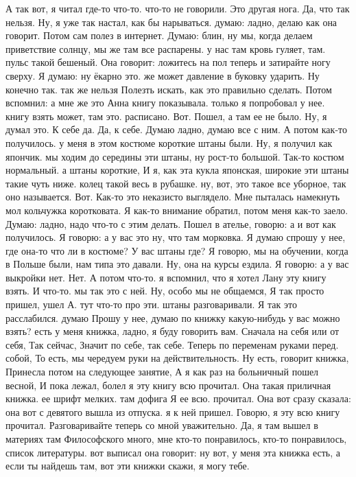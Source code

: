 А так вот, я читал где-то что-то.
что-то не говорили. Это другая нога.
Да, что так нельзя. Ну, я уже так настал, как бы нарываться. думаю: ладно, делаю как она говорит. Потом сам полез в интернет. Думаю: блин, ну мы, когда делаем приветствие солнцу, мы же там все распарены.
у нас там кровь гуляет, там.
пульс такой бешеный. Она говорит: ложитесь на пол теперь и затирайте ногу сверху.
Я думаю: ну ёкарно это.
же может давление в буковку ударить. Ну конечно так. так же нельзя Полезть искать, как это правильно сделать. Потом вспомнил:
а мне же это Анна книгу показывала.
только я попробовал у нее.
книгу взять может, там это.
расписано.
Вот.
Пошел, а там ее не было.
Ну, я думал это.
К себе да.
Да, к себе.
Думаю ладно, думаю все с ним.
А потом как-то получилось. у меня в этом костюме короткие штаны были.
Ну, я получил как япончик. мы ходим до середины эти штаны, ну рост-то большой.
Так-то костюм нормальный.
а штаны короткие, И я, как эта кукла японская, широкие эти штаны такие чуть ниже.
колец такой весь в рубашке. ну, вот, это такое все уборное, так оно называется.
Вот.
Как-то это неказисто выглядело.
Мне пыталась намекнуть мол кольчужка коротковата.
Я как-то внимание обратил, потом меня как-то заело.
Думаю: ладно, надо что-то с этим делать.
Пошел в ателье, говорю: а и вот как получилось.
Я говорю: а у вас это ну, что там морковка.
Я думаю спрошу у нее, где она-то что ли в костюме?
У вас штаны где?
Я говорю, мы на обучении, когда в Польше были, нам типа это давали.
Ну, она на курсы ездила.
Я говорю: а у вас выкройки нет.
Нет.
А потом что-то. я вспомнил, что я хотел Лану эту книгу взять.
И что-то.
мы так это с ней.
Ну, особо мы не общаемся, Я так просто пришел, ушел А.
тут что-то про эти.
штаны разговаривали. Я так это расслабился. думаю Прошу у нее, думаю по книжку какую-нибудь у вас можно взять?
есть у меня книжка, ладно, я буду говорить вам.
Сначала на себя или от себя, Так сейчас, Значит по себе, так себе.
Теперь по переменам руками перед.
собой, То есть, мы чередуем руки на действительность. Ну есть, говорит книжка, Принесла потом на следующее занятие, А я как раз на больничный пошел весной, И пока лежал, болел я эту
книгу всю прочитал. Она такая приличная книжка.
ее шрифт мелких.
там дофига Я ее всю.
прочитал.
Она вот сразу сказала: она вот с девятого вышла из отпуска. я к ней пришел.
Говорю, я эту всю книгу прочитал.
Разговаривайте теперь со мной уважительно.
Да, я там вышел в материях там Философского много, мне кто-то понравилось, кто-то понравилось, список литературы. вот выписал она говорит: ну вот, у меня эта книжка есть, а если ты найдешь там, вот эти книжки скажи, я могу тебе.
